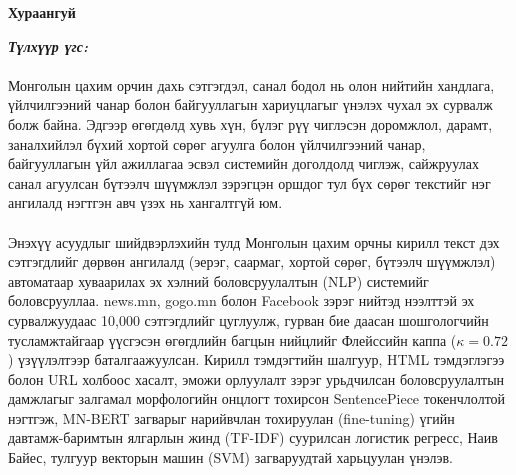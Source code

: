 ﻿%


\begin{center}
{\scshape\Large \univname\par} %
{\scshape\large \facname\par}\vspace{0.5cm} %
{\huge\textbf{{Хураангуй}} \par}
\bigskip
{\Large{\ttitle} \par} %
\bigskip

{\normalsize \shortname \par}\addressname


\end{center}

\textit{\textbf{Түлхүүр үгс: \keywordnames}}
\paragraph{}Монголын цахим орчин дахь сэтгэгдэл, санал бодол нь олон нийтийн хандлага, үйлчилгээний чанар болон байгууллагын хариуцлагыг үнэлэх чухал эх сурвалж болж байна. Эдгээр өгөгдөлд хувь хүн, бүлэг рүү чиглэсэн доромжлол, дарамт, заналхийлэл бүхий хортой сөрөг агуулга болон үйлчилгээний чанар, байгууллагын үйл ажиллагаа эсвэл системийн доголдолд чиглэж, сайжруулах санал агуулсан бүтээлч шүүмжлэл зэрэгцэн оршдог тул бүх сөрөг текстийг нэг ангилалд нэгтгэн авч үзэх нь хангалтгүй юм.

\paragraph{}Энэхүү асуудлыг шийдвэрлэхийн тулд Монголын цахим орчны кирилл текст дэх сэтгэгдлийг дөрвөн ангилалд (эерэг, саармаг, хортой сөрөг, бүтээлч шүүмжлэл) автоматаар хуваарилах эх хэлний боловсруулалтын (NLP) системийг боловсрууллаа. news.mn, gogo.mn болон Facebook зэрэг нийтэд нээлттэй эх сурвалжуудаас 10,000 сэтгэгдлийг цуглуулж, гурван бие даасан шошгологчийн тусламжтайгаар үүсгэсэн өгөгдлийн багцын нийцлийг Флейссийн каппа ($\kappa{=}0.72$) үзүүлэлтээр баталгаажуулсан. Кирилл тэмдэгтийн шалгуур, HTML тэмдэглэгээ болон URL холбоос хасалт, эможи орлуулалт зэрэг урьдчилсан боловсруулалтын дамжлагыг залгамал морфологийн онцлогт тохирсон SentencePiece токенчлолтой нэгтгэж, MN-BERT загварыг нарийвчлан тохируулан (fine-tuning) үгийн давтамж-баримтын ялгарлын жинд (TF-IDF) суурилсан логистик регресс, Наив Байес, тулгуур векторын машин (SVM) загваруудтай харьцуулан үнэлэв.

